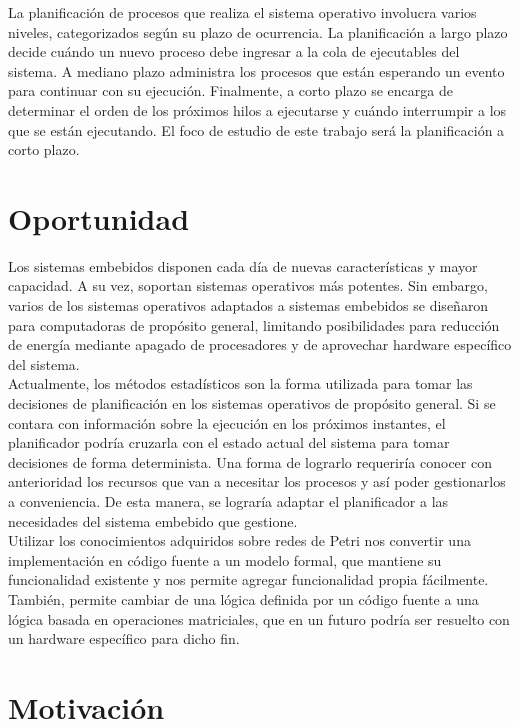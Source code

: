 \documentclass[a4paper]{book}
\begin{document}
La planificación de procesos que realiza el sistema operativo involucra varios niveles, categorizados según su plazo de ocurrencia. La planificación a largo plazo decide cuándo un nuevo proceso debe ingresar a la cola de ejecutables del sistema. A mediano plazo administra los procesos que están esperando un evento para continuar con su ejecuci\'on. Finalmente, a corto plazo se encarga de determinar el orden de los pr\'oximos hilos a ejecutarse y cuándo interrumpir a los que se est\'an ejecutando. El foco de estudio de este trabajo será la planificación a corto plazo.

\section{Oportunidad}

Los sistemas embebidos disponen cada día de nuevas características y mayor capacidad. A su vez, soportan sistemas operativos más potentes. Sin embargo, varios de los sistemas operativos adaptados a sistemas embebidos se diseñaron para computadoras de propósito general, limitando posibilidades para reducción de energía mediante apagado de procesadores y de aprovechar hardware específico del sistema.\\

Actualmente, los métodos estadísticos son la forma utilizada para tomar las decisiones de planificación en los sistemas operativos de propósito general. Si se contara con información sobre la ejecución en los próximos instantes, el planificador podría cruzarla con el estado actual del sistema para tomar decisiones de forma determinista. Una forma de lograrlo requeriría conocer con anterioridad los recursos que van a necesitar los procesos y así poder gestionarlos a conveniencia. De esta manera, se lograría adaptar el planificador a las necesidades del sistema embebido que gestione.\\

Utilizar los conocimientos adquiridos sobre redes de Petri nos convertir una implementación en código fuente a un modelo formal, que mantiene su funcionalidad existente y nos permite agregar funcionalidad propia fácilmente. También, permite cambiar de una lógica definida por un código fuente a una lógica basada en operaciones matriciales, que en un futuro podría ser resuelto con un hardware específico para dicho fin.

\section{Motivaci\'on}
\end{document}
